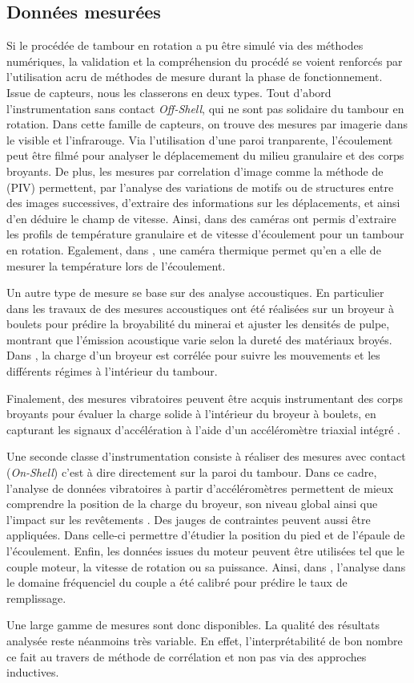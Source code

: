 \subsection{Données mesurées}

Si le procédée de tambour en rotation a pu être simulé via des méthodes numériques, la validation et la compréhension du procédé se voient renforcés par l'utilisation acru de méthodes de mesure durant la phase de fonctionnement. Issue de capteurs, nous les classerons en deux types. Tout d'abord l'instrumentation sans contact \textit{Off-Shell}, qui ne sont pas solidaire du tambour en rotation. Dans cette famille de capteurs, on trouve des mesures par imagerie dans le visible et l'infrarouge. Via l'utilisation d'une paroi tranparente, l'écoulement peut être filmé pour analyser le déplacemement du milieu granulaire et des corps broyants. De plus, les mesures par correlation d'image comme la méthode de  (PIV) permettent, par l'analyse des variations de motifs ou de structures entre des images successives, d'extraire des informations sur les déplacements, et ainsi d'en déduire le champ de vitesse. Ainsi, dans \cite{jarray_wet_2019} des caméras ont permis d'extraire les profils de température granulaire et de vitesse d'écoulement pour un tambour en rotation. Egalement, dans \cite{Adepu}, une caméra thermique permet qu'en a elle de mesurer la température lors de l'écoulement.

Un autre type de mesure se base sur des analyse accoustiques. En particulier dans les travaux de \cite{Owusu} des mesures accoustiques ont été réalisées sur un broyeur à boulets pour prédire la broyabilité du minerai et ajuster les densités de pulpe, montrant que l'émission acoustique varie selon la dureté des matériaux broyés. Dans \cite{almond}, la charge d'un broyeur est corrélée pour suivre les mouvements et les différents régimes à l'intérieur du tambour.

Finalement, des mesures vibratoires peuvent être acquis instrumentant des corps broyants pour évaluer la charge solide à l'intérieur du broyeur à boulets, en capturant les signaux d'accélération à l'aide d'un accéléromètre triaxial intégré \cite{Wang}.

Une seconde classe d'instrumentation consiste à réaliser des mesures avec contact (\textit{On-Shell}) c'est à dire directement sur la paroi du tambour. Dans ce cadre, l'analyse de données vibratoires à partir d'accéléromètres permettent de mieux comprendre la position de la charge du broyeur, son niveau global ainsi que l'impact sur les revêtements \cite{Davey}. Des jauges de contraintes peuvent aussi être appliquées. Dans \cite{tano_2005} celle-ci permettre d'étudier la position du pied et de l'épaule de l'écoulement. Enfin, les données issues du moteur peuvent être utilisées tel que le couple moteur, la vitesse de rotation ou sa puissance. Ainsi, dans \cite{pedrayes_frequency_2017}, l'analyse dans le domaine fréquenciel du couple a été calibré pour prédire le taux de remplissage.

Une large gamme de mesures sont donc disponibles. La qualité des résultats analysée reste néanmoins très variable. En effet, l'interprétabilité de bon nombre ce fait au travers de méthode de corrélation et non pas via des approches inductives.